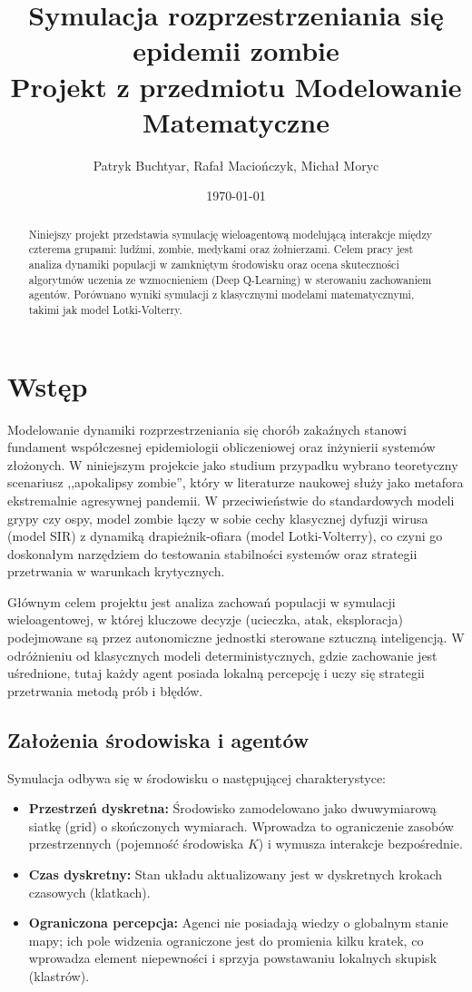 \documentclass[12pt, a4paper]{article}
\title{\textbf{Symulacja rozprzestrzeniania się epidemii zombie}\\
\large Projekt z przedmiotu Modelowanie Matematyczne}
\author{Patryk Buchtyar, Rafał Maciończyk, Michał Moryc}
\date{\today}
\begin{document}
\maketitle

\begin{abstract}
    Niniejszy projekt przedstawia symulację wieloagentową modelującą interakcje między czterema grupami: ludźmi, zombie, medykami oraz żołnierzami. Celem pracy jest analiza dynamiki populacji w zamkniętym środowisku oraz ocena skuteczności algorytmów uczenia ze wzmocnieniem (Deep Q-Learning) w sterowaniu zachowaniem agentów. Porównano wyniki symulacji z klasycznymi modelami matematycznymi, takimi jak model Lotki-Volterry.
\end{abstract}

\tableofcontents
\newpage

\section{Wstęp}

Modelowanie dynamiki rozprzestrzeniania się chorób zakaźnych stanowi fundament
współczesnej epidemiologii obliczeniowej oraz inżynierii systemów złożonych. W
niniejszym projekcie jako studium przypadku wybrano teoretyczny scenariusz
,,apokalipsy zombie'', który w literaturze naukowej służy jako metafora
ekstremalnie agresywnej pandemii. W przeciwieństwie do standardowych modeli
grypy czy ospy, model zombie łączy w sobie cechy klasycznej dyfuzji wirusa
(model SIR) z dynamiką drapieżnik-ofiara (model Lotki-Volterry), co czyni go
doskonałym narzędziem do testowania stabilności systemów oraz strategii
przetrwania w warunkach krytycznych.

Głównym celem projektu jest analiza zachowań populacji w symulacji
wieloagentowej, w której kluczowe decyzje (ucieczka, atak, eksploracja)
podejmowane są przez autonomiczne jednostki sterowane sztuczną inteligencją. W
odróżnieniu od klasycznych modeli deterministycznych, gdzie zachowanie jest
uśrednione, tutaj każdy agent posiada lokalną percepcję i uczy się strategii
przetrwania metodą prób i błędów.

\subsection{Założenia środowiska i agentów}
Symulacja odbywa się w środowisku o następującej charakterystyce:
\begin{itemize}
    \item \textbf{Przestrzeń dyskretna:} Środowisko zamodelowano jako dwuwymiarową siatkę (grid) o skończonych wymiarach. Wprowadza to ograniczenie zasobów przestrzennych (pojemność środowiska $K$) i wymusza interakcje bezpośrednie.
    \item \textbf{Czas dyskretny:} Stan układu aktualizowany jest w dyskretnych krokach czasowych (klatkach).
    \item \textbf{Ograniczona percepcja:} Agenci nie posiadają wiedzy o globalnym stanie mapy; ich pole widzenia ograniczone jest do promienia kilku kratek, co wprowadza element niepewności i sprzyja powstawaniu lokalnych skupisk (klastrów).
\end{itemize}
\end{document}
